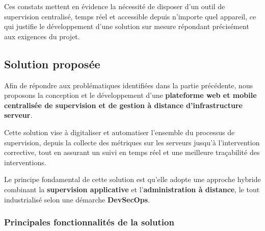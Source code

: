 Ces constats mettent en évidence la nécessité de disposer d'un outil de supervision
centralisé, temps réel et accessible depuis n'importe quel appareil, ce qui justifie le
développement d'une solution sur mesure répondant précisément aux exigences du projet.

\subsection{Solution proposée}
Afin de répondre aux problématiques identifiées dans la partie précédente, nous
proposons la conception et le développement d'une \textbf{plateforme web et mobile
centralisée de supervision et de gestion à distance d'infrastructure serveur}.

Cette solution vise à digitaliser et automatiser l'ensemble du processus de supervision,
depuis la collecte des métriques sur les serveurs jusqu'à l'intervention corrective,
tout en assurant un suivi en temps réel et une meilleure traçabilité des interventions.

Le principe fondamental de cette solution est qu'elle adopte une approche hybride
combinant la \textbf{supervision applicative} et l'\textbf{administration à distance},
le tout industrialisé selon une démarche \textbf{DevSecOps}.

\subsubsection*{Principales fonctionnalités de la solution}

